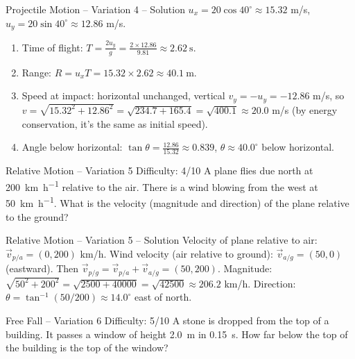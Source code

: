 \documentclass{beamer}
\begin{document}
\begin{frame}[shrink=15]{Projectile Motion – Variation 4 – Solution}
$u_x = 20\cos40^\circ \approx 15.32$ m/s, $u_y = 20\sin40^\circ \approx 12.86$ m/s.
\begin{enumerate}
    \item Time of flight: $T = \frac{2u_y}{g} = \frac{2\times12.86}{9.81} \approx \SI{2.62}{\second}$.
    \item Range: $R = u_x T = 15.32\times2.62 \approx \SI{40.1}{\meter}$.
    \item Speed at impact: horizontal unchanged, vertical $v_y = -u_y = -12.86$ m/s, so $v = \sqrt{15.32^2 + 12.86^2} = \sqrt{234.7 + 165.4} = \sqrt{400.1} \approx 20.0$ m/s (by energy conservation, it's the same as initial speed).
    \item Angle below horizontal: $\tan\theta = \frac{12.86}{15.32} \approx 0.839$, $\theta \approx 40.0^\circ$ below horizontal.
\end{enumerate}
\end{frame}

\begin{frame}[t,shrink=15]{Relative Motion – Variation 5 \hfill Difficulty: 4/10}
A plane flies due north at \SI{200}{\km\per\hour} relative to the air. There is a wind blowing from the west at \SI{50}{\km\per\hour}. What is the velocity (magnitude and direction) of the plane relative to the ground?
\end{frame}

\begin{frame}[shrink=15]{Relative Motion – Variation 5 – Solution}
Velocity of plane relative to air: $\vec{v}_{p/a} = (0, 200)$ km/h. Wind velocity (air relative to ground): $\vec{v}_{a/g} = (50, 0)$ (eastward). Then $\vec{v}_{p/g} = \vec{v}_{p/a} + \vec{v}_{a/g} = (50, 200)$.
Magnitude: $\sqrt{50^2 + 200^2} = \sqrt{2500+40000} = \sqrt{42500} \approx 206.2$ km/h.
Direction: $\theta = \tan^{-1}(50/200) \approx 14.0^\circ$ east of north.
\end{frame}

\begin{frame}[t,shrink=15]{Free Fall – Variation 6 \hfill Difficulty: 5/10}
A stone is dropped from the top of a building. It passes a window of height \SI{2.0}{\m} in \SI{0.15}{\second}. How far below the top of the building is the top of the window?
\end{frame}
\end{document}
